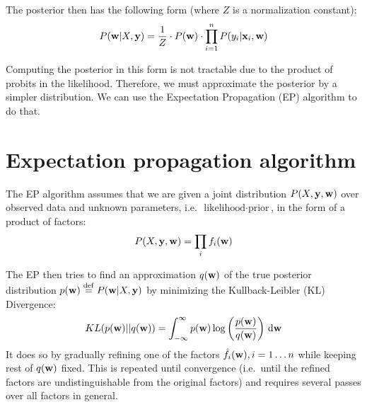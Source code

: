 \documentclass[10pt,a4paper,notitlepage]{article}
\begin{document}
The posterior then has the following form (where $Z$ is a normalization constant):
\begin{equation}\label{eq:epp_posterior}
P(\mathbf{w}|X, \mathbf{y}) = \frac{1}{Z} \cdot P(\mathbf{w}) \cdot \prod_{i=1}^n P(y_i|\mathbf{x}_i, \mathbf{w})
\end{equation}

Computing the posterior in this form is not tractable due to the product of probits in the likelihood. Therefore, we must approximate the posterior by a simpler distribution. We can use the Expectation Propagation (EP) algorithm to do that.

\section{Expectation propagation algorithm}\label{sec:ep_theory}

The EP algorithm assumes that we are given a joint distribution $P(X, \mathbf{y}, \mathbf{w})$ over observed data and unknown parameters, i.e.\ $\mbox{likelihood}\cdot\mbox{prior}$, in the form of a product of factors:
\begin{equation}
P(X, \mathbf{y}, \mathbf{w}) = \prod_{i} f_i(\mathbf{w})
\end{equation}

The EP then tries to find an approximation $q(\mathbf{w})$ of the true posterior distribution $p(\mathbf{w}) \stackrel{\mathrm{def}}{=} P(\mathbf{w}|X,\mathbf{y})$ by minimizing the Kullback-Leibler (KL) Divergence: 
\begin{equation}
KL(p(\mathbf{w})||q(\mathbf{w})) = \int_{-\infty}^{\infty} p(\mathbf{w}) \log\left(\frac{p(\mathbf{w})}{q(\mathbf{w})}\right)\,\mathrm{d}\mathbf{w}
\end{equation} 
It does so by gradually refining one of the factors $\hat{f}_i(\mathbf{w}), i=1\dots n$ while keeping rest of $q(\mathbf{w})$ fixed. This is repeated until convergence (i.e.\ until the refined factors are undistinguishable from the original factors) and requires several passes over all factors in general.
\end{document}
